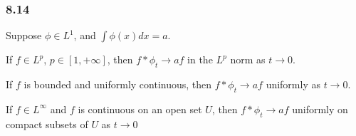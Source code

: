 \documentclass[../../main.tex]{subfiles}
\begin{document}
\providecommand{\cnv}{\ast}
\providecommand{\zint}{\int\limits_{z\in\real^n}}
\providecommand{\ubc}{\operatorname{UBC}}
\subsubsection*{8.14}
\begin{wts}
    Suppose $\phi\in L^1$, and $\int\phi(x)dx=a$.
    \begin{enumalpha}
        \item If $f\in L^p$, $p\in[1,+\infty]$, then $f\ast \phi_t\to af$ in the $L^p$ norm as $t\to 0$.
        \item If $f$ is bounded and uniformly continuous, then $f\ast \phi_t\to af$ uniformly as $t\to 0$.
        \item If $f\in L^\infty$ and $f$ is continuous on an open set $U$, then $f\ast \phi_t\to af$ uniformly on compact subsets of $U$ as $t\to 0$
    \end{enumalpha}
\end{wts}
\end{document}
